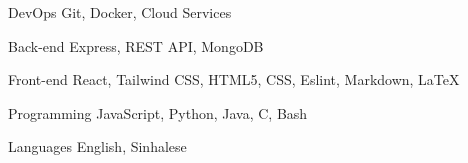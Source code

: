 

\begin{cvskills}

  \cvskill
    {DevOps} %
    {Git, Docker, Cloud Services} %

  \cvskill
    {Back-end} %
    {Express, REST API, MongoDB} %

  \cvskill
    {Front-end} %
    {React, Tailwind CSS, HTML5, CSS, Eslint, Markdown, LaTeX} %

  \cvskill
    {Programming} %
    {JavaScript, Python, Java, C, Bash} %

  \cvskill
    {Languages} %
    {English, Sinhalese} %

\end{cvskills}
